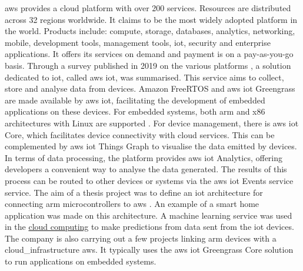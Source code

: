\gls{aws} \cite{amazon_web_services} provides a \gls{cloud} platform with over 200 services. Resources are distributed across 32 regions worldwide. It claims to be the most widely adopted platform in the world. Products include: compute, storage, databases, analytics, networking, mobile, development tools, management tools, \acrshort{iot}, security and enterprise applications. It offers its services on demand and payment is on a pay-as-you-go basis. Through a survey published in 2019 on the various platforms \cite{survey_iot_platform_comparison}, a solution dedicated to \acrshort{iot}, called \gls{aws} \acrshort{iot}, was summarised. This service aims to collect, store and analyse data from devices. Amazon FreeRTOS and \gls{aws} \acrshort{iot} Greengrass are made available by \gls{aws} \acrshort{iot}, facilitating the development of embedded applications on these devices. For embedded systems, both \gls{arm} and x86 architectures with Linux are supported \cite{fog_computing_platforms_comparison}. For device management, there is \gls{aws} \acrshort{iot} Core, which facilitates device connectivity with \gls{cloud} services. This can be complemented by \gls{aws} \acrshort{iot} Things Graph to visualise the data emitted by devices. In terms of data processing, the platform provides \gls{aws} \acrshort{iot} Analytics, offering developers a convenient way to analyse the data generated. The results of this process can be routed to other devices or systems via the \gls{aws} \acrshort{iot} Events service \cite{survey_iot_platform_comparison} service. The aim of a thesis project was to define an \acrshort{iot} architecture for connecting \gls{arm} microcontrollers to \gls{aws} \cite{aws_arm_architecture_iot}. An example of a smart home application was made on this architecture. A machine learning service was used in the \hyperref[subsec:cloudcomputing]{cloud computing} to make predictions from data sent from the \acrshort{iot} devices. The company  is also carrying out a few projects linking \gls{arm} devices with a \gls{cloud_infrastructure} \gls{aws}. It typically uses the \gls{aws} \acrshort{iot} Greengrass Core solution to run applications on embedded systems.

